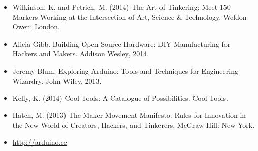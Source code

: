 \documentclass{../fal_assignment}
\begin{document}
\begin{itemize}
    \item Wilkinson, K. and Petrich, M. (2014) The Art of Tinkering: Meet 150 Markers Working at the Intersection of Art, Science \& Technology. Weldon Owen: London.
    \item Alicia Gibb. Building Open Source Hardware: DIY Manufacturing for Hackers and Makers. Addison Wesley, 2014. 
    \item Jeremy Blum. Exploring Arduino: Tools and Techniques for Engineering Wizardry. John Wiley, 2013. 
    \item Kelly, K. (2014) Cool Tools: A Catalogue of Possibilities. Cool Tools.
    \item Hatch, M. (2013) The Maker Movement Manifesto: Rules for Innovation in the New World of Creators, Hackers, and Tinkerers. McGraw Hill: New York.
    \item \url{http://arduino.cc}
\end{itemize}
\end{document}
